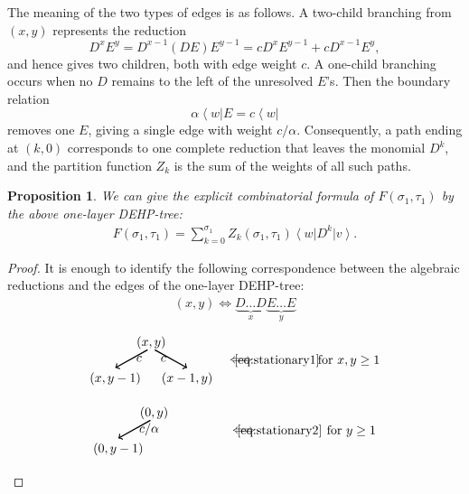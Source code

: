 \documentclass[12pt,a4paper]{amsart}
\newcommand{\bra}[1]{\left\langle #1\right|}
\newcommand{\ket}[1]{\left|#1\right\rangle}
\newtheorem{proposition}[theorem]{Proposition}
\theoremstyle{remark}
\numberwithin{equation}{section} \numberwithin{theorem}{section}
\begin{document}
The meaning of the two types of edges is as follows. 
A two-child branching from $(x,y)$ represents the reduction
\[
D^xE^y
=
D^{x-1}(DE)E^{y-1}
=
cD^xE^{y-1}+cD^{x-1}E^y,
\]
and hence gives two children, both with edge weight $c$. 
A one-child branching occurs when no $D$ remains to the left of the unresolved $E$'s. 
Then the boundary relation
\[
\alpha\bra{w}E=c\bra{w}
\]
removes one $E$, giving a single edge with weight $c/\alpha$. 
Consequently, a path ending at $(k,0)$ corresponds to one complete reduction that leaves the monomial $D^k$, and the partition function $Z_k$ is the sum of the weights of all such paths.

\begin{proposition}
\label{prop:one-layer}
We can give the explicit combinatorial formula of $F(\sigma_1, \tau_1)$ by the above one-layer DEHP-tree:
\begin{align}
F(\sigma_1, \tau_1)=\sum_{k=0}^{\sigma_1}Z_k(\sigma_1, \tau_1)\bra{w}D^{k}\ket{v}.
\end{align}
\end{proposition}

\begin{proof}
It is enough to identify the following correspondence between the algebraic reductions and the edges of the one-layer DEHP-tree:
%
\begin{align*}
(x,y) \iff  \underbrace{D \ldots D}_{x} \underbrace{E \ldots E}_{y} 
\end{align*}
%
\begin{align*}
\begin{tikzpicture}[scale=1]
\draw (0,1) node {$(x,y)$};
\draw[black,line width=1pt,->] (-0.1,0.8) -- (-1,0.3) node[midway, anchor=west]{$c$};
\draw (-1,0) node {$(x,y-1)$};
\draw[black,line width=1pt,->] (0.1,0.8) -- (1,0.3) node[midway, anchor=east]{$c$};
\draw (1,0) node {$(x-1,y)$};
\draw (2.5,0.5) node {$\iff$};
\draw (3.5,0.5) node {$\eqref{eq:stationary1}$};
\draw (5.5,0.5) node {$\text{for} \ x,y \geq 1$};
\end{tikzpicture}
\end{align*}
%
\begin{align*}
\begin{tikzpicture}[scale=1]
\draw (0,1) node {$(0,y)$};
\draw[black,line width=1pt,->] (-0.1,0.8) -- (-1,0.3) node[midway, anchor=west]{$c/\alpha$};
\draw (-1,0) node {$(0,y-1)$};
\draw (2.5,0.5) node {$\iff$};
\draw (3.5,0.5) node {$\eqref{eq:stationary2}$};
\draw (5.5,0.5) node {$\text{for} \ y \geq 1$};
\end{tikzpicture}
\end{align*}
%
\end{proof}
\end{document}
